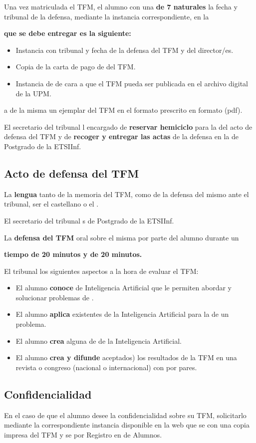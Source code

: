 Una vez matriculada el TFM, el alumno con una {\bf  de 7 naturales} la fecha y tribunal de la defensa, mediante la instancia correspondiente, en la {\bf  que se debe entregar es la siguiente:

\begin{itemize}
\item Instancia con tribunal y fecha de la defensa del TFM y del director/es.
\item Copia de la carta de pago de del TFM.
\item Instancia de de cara a que el TFM pueda ser publicada en el archivo digital de la UPM.
\end{itemize}
a de la misma un ejemplar del TFM en el formato prescrito en formato  (pdf).

El secretario del tribunal l encargado de {\bf reservar hemiciclo} para la del acto de defensa del TFM y de {\bf recoger y entregar las actas} de la defensa en la de Postgrado de la ETSIInf.

\subsection{Acto de defensa del TFM}
\noindent La {\bf lengua} tanto de la memoria del TFM, como de la defensa del mismo ante el tribunal, ser el castellano o el .

El secretario del tribunal s de Postgrado de la ETSIInf.

La {\bf defensa del TFM}  oral sobre el misma por parte del alumno durante un {\bf tiempo de 20 minutos y de 20 minutos.

El tribunal los siguientes aspectos a la hora de evaluar el TFM:
\begin{itemize}
\item El alumno {\bf conoce}  de Inteligencia Artificial que le permiten abordar y solucionar problemas de .
\item El alumno {\bf aplica}  existentes de la Inteligencia Artificial para la de un problema.
\item El alumno {\bf crea} alguna de de la Inteligencia Artificial.
\item El alumno {\bf crea y difunde}  aceptados) los resultados de la TFM en una revista o congreso (nacional o internacional) con por pares.
\end{itemize}



\subsection{Confidencialidad}
\noindent En el caso de que el alumno desee la confidencialidad sobre su TFM, solicitarlo mediante la correspondiente instancia disponible en la web que se con una copia impresa del TFM y se por Registro en de Alumnos.


}}
